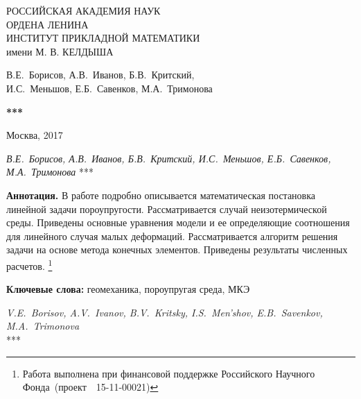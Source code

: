 \documentclass[a4paper, 12pt]{article}
\newcommand{\No}{\textnumero}
\begin{document}
\begin{titlepage}

\begin{center}
РОССИЙСКАЯ АКАДЕМИЯ НАУК \\
ОРДЕНА ЛЕНИНА \\
ИНСТИТУТ ПРИКЛАДНОЙ МАТЕМАТИКИ \\
имени М. В. КЕЛДЫША

\vspace*{60mm}

\large{В.Е.~Борисов, А.В.~Иванов, Б.В.~Критский,\\
И.С.~Меньшов, Е.Б.~Савенков, М.А.~Тримонова
}

\vspace*{20mm}

\textbf{\Large
***
}

\vspace*{110mm}

\Large{Москва, 2017}

\vspace*{-50mm}

\end{center}

\end{titlepage}

\setcounter{page}{2}

\thispagestyle{empty}

\noindent\emph{ В.Е.~Борисов, А.В.~Иванов, Б.В.~Критский,
И.С.~Меньшов, Е.Б.~Савенков, М.А.~Тримонова} ***

\vspace*{5mm}

\noindent\textbf{ Аннотация.}
%
В работе подробно описывается математическая постановка линейной
задачи пороупругости. Рассматривается случай неизотермической среды.
Приведены основные уравнения модели и ее определяющие соотношения для
линейного случая малых деформаций. Рассматривается алгоритм решения
задачи на основе метода конечных элементов. Приведены результаты
численных расчетов.
\footnote{Работа выполнена при финансовой поддержке Российского Научного Фонда~(проект~\No~15-11-00021)}

\vspace*{3mm}

\noindent\textbf{Ключевые слова:} геомеханика, пороупругая среда, МКЭ

\vspace*{6mm}

\noindent\emph{ V.E.~Borisov, \; A.V.~Ivanov, \; B.V.~Kritsky, \; I.S.~Men'shov, \; E.B.~Savenkov, \; M.A.~Trimonova} \\***
\end{document}
